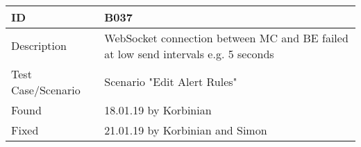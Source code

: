 \documentclass{scrreprt}
\begin{document}
\\ \\ \\
\begin{tabularx}{12cm}{l|X}
ID					& B037 \\
\hline
Description 		& 
WebSocket connection between MC and BE failed at low send intervals e.g. 5 seconds\\
\hline
Test Case/Scenario	& Scenario "Edit Alert Rules" \\
\hline
Found				& 18.01.19 by Korbinian  \\
\hline
Fixed				& 21.01.19 by Korbinian and Simon  \\ 
\end{tabularx}
\end{document}
